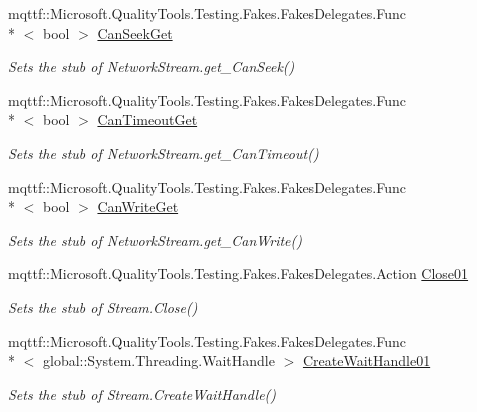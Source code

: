 \begin{DoxyCompactItemize}
mqttf\-::\-Microsoft.\-Quality\-Tools.\-Testing.\-Fakes.\-Fakes\-Delegates.\-Func\\*
$<$ bool $>$ \hyperlink{class_system_1_1_net_1_1_sockets_1_1_fakes_1_1_stub_network_stream_a73098f500b52f15f8bc8aa8e44ebe7b6}{Can\-Seek\-Get}
\begin{DoxyCompactList}\small\item\em Sets the stub of Network\-Stream.\-get\-\_\-\-Can\-Seek()\end{DoxyCompactList}\item 
mqttf\-::\-Microsoft.\-Quality\-Tools.\-Testing.\-Fakes.\-Fakes\-Delegates.\-Func\\*
$<$ bool $>$ \hyperlink{class_system_1_1_net_1_1_sockets_1_1_fakes_1_1_stub_network_stream_ab7a74f801d3a4718e515e912feded1a4}{Can\-Timeout\-Get}
\begin{DoxyCompactList}\small\item\em Sets the stub of Network\-Stream.\-get\-\_\-\-Can\-Timeout()\end{DoxyCompactList}\item 
mqttf\-::\-Microsoft.\-Quality\-Tools.\-Testing.\-Fakes.\-Fakes\-Delegates.\-Func\\*
$<$ bool $>$ \hyperlink{class_system_1_1_net_1_1_sockets_1_1_fakes_1_1_stub_network_stream_a704188040793704ea367ae0615843147}{Can\-Write\-Get}
\begin{DoxyCompactList}\small\item\em Sets the stub of Network\-Stream.\-get\-\_\-\-Can\-Write()\end{DoxyCompactList}\item 
mqttf\-::\-Microsoft.\-Quality\-Tools.\-Testing.\-Fakes.\-Fakes\-Delegates.\-Action \hyperlink{class_system_1_1_net_1_1_sockets_1_1_fakes_1_1_stub_network_stream_abde298ecda81c90b405ca4c33c33c708}{Close01}
\begin{DoxyCompactList}\small\item\em Sets the stub of Stream.\-Close()\end{DoxyCompactList}\item 
mqttf\-::\-Microsoft.\-Quality\-Tools.\-Testing.\-Fakes.\-Fakes\-Delegates.\-Func\\*
$<$ global\-::\-System.\-Threading.\-Wait\-Handle $>$ \hyperlink{class_system_1_1_net_1_1_sockets_1_1_fakes_1_1_stub_network_stream_ad431d17e3abb2ab657ad1e610039fd33}{Create\-Wait\-Handle01}
\begin{DoxyCompactList}\small\item\em Sets the stub of Stream.\-Create\-Wait\-Handle()\end{DoxyCompactList}\item 

\end{DoxyCompactItemize}
